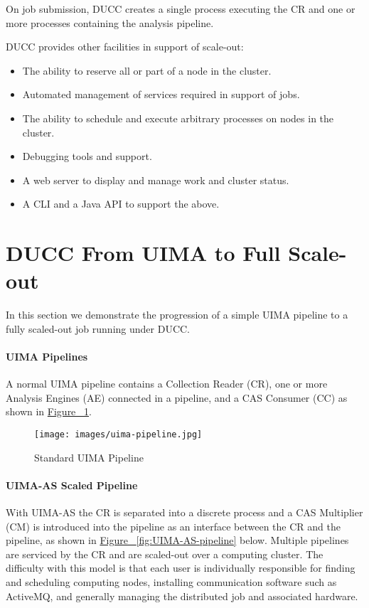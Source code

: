     On job submission, DUCC creates a single process executing the CR and
    one or more processes containing the analysis pipeline.

    DUCC provides other facilities in support of scale-out:
    \begin{itemize}
      \item The ability to reserve all or part of a node in the cluster.
      \item Automated management of services required in support of jobs.
      \item The ability to schedule and execute arbitrary processes on nodes in the
        cluster.
      \item Debugging tools and support.
      \item A web server to display and manage work and cluster status.
      \item A CLI and a Java API to support the above.
    \end{itemize}
    
    \section{DUCC From UIMA to Full Scale-out}

    In this section we demonstrate the progression of a simple UIMA pipeline to a fully
    scaled-out job running under DUCC.

    \paragraph{UIMA Pipelines}
    A normal UIMA pipeline
    contains a Collection Reader (CR), one or more Analysis Engines (AE) connected in a pipeline, and a CAS
    Consumer (CC) as shown in \hyperref[fig:UIMA-pipeline]{Figure ~\ref{fig:UIMA-pipeline}}.

    \begin{figure}[H]
      \centering
      \texttt{[image: images/uima-pipeline.jpg]}
      \caption{Standard UIMA Pipeline}
      \label{fig:UIMA-pipeline}
    \end{figure}

    \paragraph{UIMA-AS  Scaled Pipeline}
    With UIMA-AS the CR is separated into a discrete process and a CAS Multiplier (CM) is introduced 
    into the pipeline as an interface between the CR and the pipeline, as shown in
    \hyperref[fig:UIMA-AS-pipeline]{Figure ~\ref{fig:UIMA-AS-pipeline}} below.
    Multiple pipelines are serviced by the 
    CR and are scaled-out over a computing cluster.  The difficulty with this model is that each
    user is individually responsible for finding and scheduling computing nodes, installing
    communication software such as ActiveMQ, and generally managing the distributed job and
    associated hardware.

